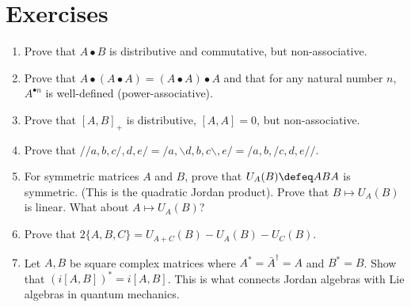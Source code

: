 \section*{Exercises}
\begin{enumerate}
\item Prove that $A\bullet B$ is distributive and commutative, but non-associative.
\item Prove that $A\bullet (A\bullet A)=(A\bullet A)\bullet A$ and that 
for any natural number $n$, $A^{\bullet n}$ is well-defined (power-associative).

\item Prove that $[A,B]_+$ is distributive, $[A,A]=0$, but non-associative.

\item Prove that $//a,b,c/,d,e/=/a,\backslash d,b,c\backslash,e/=/a,b,/c,d,e//$.

\item For symmetric matrices $A$ and $B$, prove that $U_A(B)\defeq ABA$ is symmetric.
(This is the quadratic Jordan product).  Prove that $B\mapsto U_A(B)$ is linear.  What 
about $A\mapsto U_A(B)$?

\item Prove that $2\{A,B,C\}=U_{A+C}(B)-U_A(B)-U_C(B)$.

\item Let $A,B$ be square complex matrices where $A^*=\bar{A}^{\dagger}=A$ and 
$B^*=B$.  Show that $(i[A,B])^*=i[A,B]$.  This is what connects Jordan algebras 
with Lie algebras in quantum mechanics.
\end{enumerate}